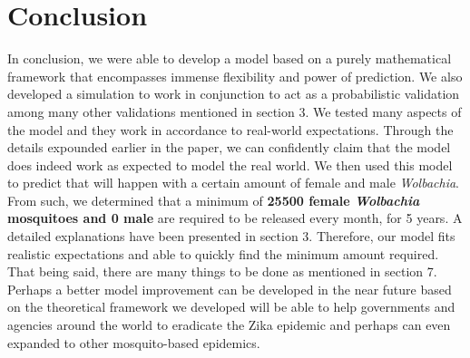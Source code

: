 \documentclass{article}
\begin{document}
\section{Conclusion}
In conclusion, we were able to develop a model based on a purely mathematical framework that encompasses immense flexibility and power of prediction. We also developed a simulation to work in conjunction to act as a probabilistic validation among many other validations mentioned in section 3. We tested many aspects of the model and they work in accordance to real-world expectations. Through the details expounded earlier in the paper, we can confidently claim that the model does indeed work as expected to model the real world. We then used this model to predict that will happen with a certain amount of female and male \textit{Wolbachia}. From such, we determined that a minimum of \textbf{25500 female \textit{Wolbachia} mosquitoes and 0 male} are required to be released every month, for 5 years. A detailed explanations have been presented in section 3. Therefore, our model fits realistic expectations and able to quickly find the minimum amount required. That being said, there are many things to be done as mentioned in section 7. Perhaps a better model improvement can be developed in the near future based on the theoretical framework we developed will be able to help governments and agencies around the world to eradicate the Zika epidemic and perhaps can even expanded to other mosquito-based epidemics.
\end{document}
